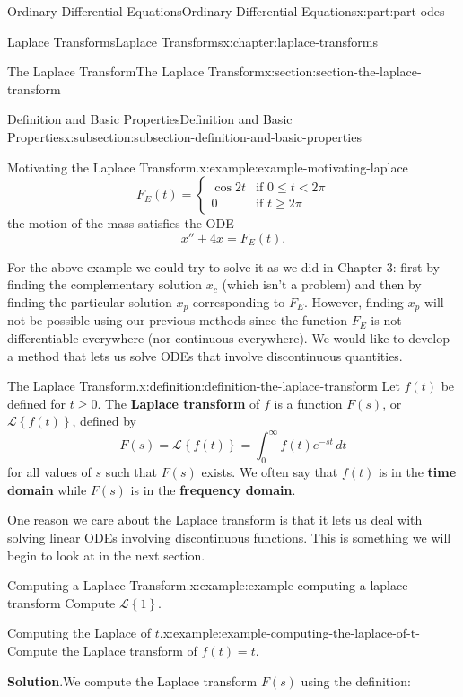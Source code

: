 \documentclass[oneside,10pt,]{book}
\newcommand{\blocktitlefont}{\relax}
\newcommand{\terminology}[1]{\textbf{#1}}
\numberwithin{equation}{part}
\newcommand{\Int}[2]{\int_{#1}^{#2}}
\newcommand{\lt}{<}
\newcommand{\amp}{&}
\begin{document}
\begin{partptx}{Ordinary Differential Equations}{}{Ordinary Differential Equations}{}{}{x:part:part-odes}
\begin{chapterptx}{Laplace Transforms}{}{Laplace Transforms}{}{}{x:chapter:laplace-transforms}
\begin{sectionptx}{The Laplace Transform}{}{The Laplace Transform}{}{}{x:section:section-the-laplace-transform}
\begin{subsectionptx}{Definition and Basic Properties}{}{Definition and Basic Properties}{}{}{x:subsection:subsection-definition-and-basic-properties}
\begin{example}{Motivating the Laplace Transform.}{x:example:example-motivating-laplace}
\begin{equation*}
F_{E}(t) = 
\begin{cases}
\cos2t \amp \text{if }0\leq t\lt 2\pi\\
0 \amp\text{if } t\geq2\pi  
\end{cases}
\end{equation*}
the motion of the mass satisfies the ODE%
\begin{equation*}
x''+4x = F_{E}(t).
\end{equation*}
%
\end{example}
For the above example we could try to solve it as we did in Chapter 3: first by finding the complementary solution \(x_{c}\) (which isn't a problem) and then by finding the particular solution \(x_{p}\) corresponding to \(F_{E}\). However, finding \(x_{p}\) will not be possible using our previous methods since the function \(F_{E}\) is not differentiable everywhere (nor continuous everywhere). We would like to develop a method that lets us solve ODEs that involve discontinuous quantities.%
\begin{definition}{The Laplace Transform.}{x:definition:definition-the-laplace-transform}%
Let \(f(t)\) be defined for \(t\geq0\). The \terminology{Laplace transform} of \(f\) is a function \(F(s)\), or \(\mathcal{L}\left\{ f(t) \right\}\), defined by%
\begin{equation*}
F(s) = \mathcal{L}\left\{ f(t) \right\} = \Int{0}{\infty}f(t)e^{-st}\,dt
\end{equation*}
for all values of \(s\) such that \(F(s)\) exists. We often say that \(f(t)\) is in the \terminology{time domain} while \(F(s)\) is in the \terminology{frequency domain}.%
\end{definition}
One reason we care about the Laplace transform is that it lets us deal with solving linear ODEs involving discontinuous functions. This is something we will begin to look at in the next section.%
\begin{example}{Computing a Laplace Transform.}{x:example:example-computing-a-laplace-transform}%
Compute \(\mathcal{L}\left\{ 1 \right\}\).%
\end{example}
\begin{example}{Computing the Laplace of \(t\).}{x:example:example-computing-the-laplace-of-t-}%
Compute the Laplace transform of \(f(t) = t\).%
\par\smallskip%
\noindent\textbf{\blocktitlefont Solution}.\hypertarget{g:solution:idp105548781473952}{}\quad{}We compute the Laplace transform \(F(s)\) using the definition:%
\begin{align*}

\end{align*}
\end{example}
\end{subsectionptx}
\end{sectionptx}
\end{chapterptx}
\end{partptx}
\end{document}
